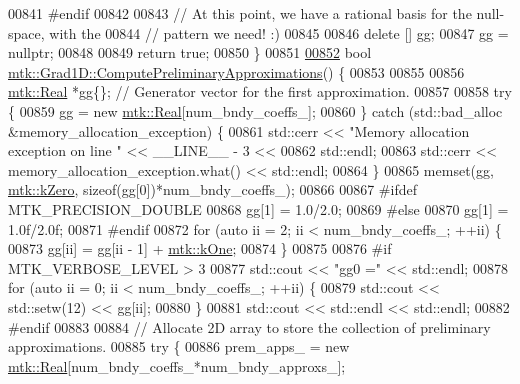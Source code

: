 \begin{DoxyCode}
{{00841 \textcolor{preprocessor}{  #endif}
00842 
00843   \textcolor{comment}{// At this point, we have a rational basis for the null-space, with the}
00844   \textcolor{comment}{// pattern we need! :)}
00845 
00846   \textcolor{keyword}{delete} [] gg;
00847   gg = \textcolor{keyword}{nullptr};
00848 
00849   \textcolor{keywordflow}{return} \textcolor{keyword}{true};
00850 \}
00851 
\hypertarget{mtk__grad__1d_8cc_source_l00852}{}\hyperlink{classmtk_1_1Grad1D_add4c68a6e78d8b9c2b800b3f96f4757d}{00852} \textcolor{keywordtype}{bool} \hyperlink{classmtk_1_1Grad1D_add4c68a6e78d8b9c2b800b3f96f4757d}{mtk::Grad1D::ComputePreliminaryApproximations}() \{
00853 
00855 
00856   \hyperlink{group__c01-roots_gac080bbbf5cbb5502c9f00405f894857d}{mtk::Real} *gg\{\}; \textcolor{comment}{// Generator vector for the first approximation.}
00857 
00858   \textcolor{keywordflow}{try} \{
00859     gg = \textcolor{keyword}{new} \hyperlink{group__c01-roots_gac080bbbf5cbb5502c9f00405f894857d}{mtk::Real}[num\_bndy\_coeffs\_];
00860   \} \textcolor{keywordflow}{catch} (std::bad\_alloc &memory\_allocation\_exception) \{
00861     std::cerr << \textcolor{stringliteral}{"Memory allocation exception on line "} << \_\_LINE\_\_ - 3 <<
00862       std::endl;
00863     std::cerr << memory\_allocation\_exception.what() << std::endl;
00864   \}
00865   memset(gg, \hyperlink{group__c01-roots_ga59a451a5fae30d59649bcda274fea271}{mtk::kZero}, \textcolor{keyword}{sizeof}(gg[0])*num\_bndy\_coeffs\_);
00866 
00867 \textcolor{preprocessor}{  #ifdef MTK\_PRECISION\_DOUBLE}
00868   gg[1] = 1.0/2.0;
00869 \textcolor{preprocessor}{  #else}
00870   gg[1] = 1.0f/2.0f;
00871 \textcolor{preprocessor}{  #endif}
00872   \textcolor{keywordflow}{for} (\textcolor{keyword}{auto} ii = 2; ii < num\_bndy\_coeffs\_; ++ii) \{
00873     gg[ii] = gg[ii - 1] + \hyperlink{group__c01-roots_ga26407c24d43b6b95480943340d285c71}{mtk::kOne};
00874   \}
00875 
00876 \textcolor{preprocessor}{  #if MTK\_VERBOSE\_LEVEL > 3}
00877   std::cout << \textcolor{stringliteral}{"gg0 ="} << std::endl;
00878   \textcolor{keywordflow}{for} (\textcolor{keyword}{auto} ii = 0; ii < num\_bndy\_coeffs\_; ++ii) \{
00879     std::cout << std::setw(12) << gg[ii];
00880   \}
00881   std::cout << std::endl << std::endl;
00882 \textcolor{preprocessor}{  #endif}
00883 
00884   \textcolor{comment}{// Allocate 2D array to store the collection of preliminary approximations.}
00885   \textcolor{keywordflow}{try} \{
00886     prem\_apps\_ = \textcolor{keyword}{new} \hyperlink{group__c01-roots_gac080bbbf5cbb5502c9f00405f894857d}{mtk::Real}[num\_bndy\_coeffs\_*num\_bndy\_approxs\_];
}}
\end{DoxyCode}
